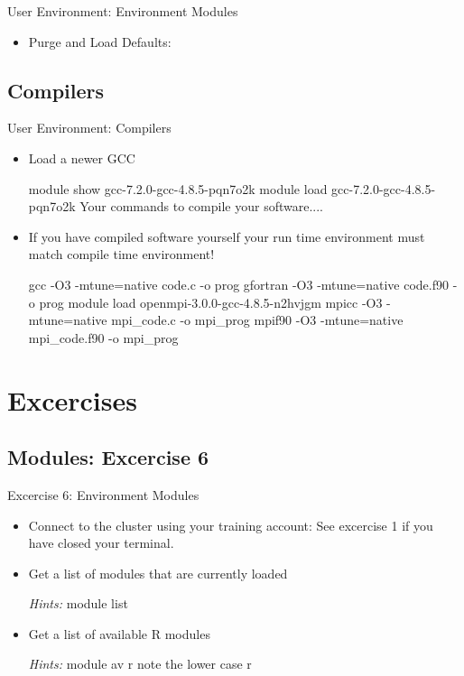 \begin{frame}[fragile]{User Environment: Environment Modules}
\begin{itemize}
\item{Purge and Load Defaults:}
\smallskip
\end{itemize}
\end{frame}

\subsection{Compilers}
\begin{frame}[fragile]{User Environment: Compilers}
  \begin{itemize}
    \item{Load a newer GCC}
\begin{semiverbatim}
\scriptsize
module show gcc-7.2.0-gcc-4.8.5-pqn7o2k
module load gcc-7.2.0-gcc-4.8.5-pqn7o2k
Your commands to compile your software....
\end{semiverbatim}
\medskip
\item{If you have compiled software yourself your run time environment must match compile time environment!}

\begin{semiverbatim}
\scriptsize
gcc -O3 -mtune=native code.c -o prog
gfortran -O3 -mtune=native code.f90 -o prog
\medskip
module load openmpi-3.0.0-gcc-4.8.5-n2hvjgm
mpicc -O3 -mtune=native mpi_code.c -o mpi_prog
mpif90 -O3 -mtune=native mpi_code.f90 -o mpi_prog
\end{semiverbatim}
\pause
\end{itemize}
\end{frame}

\section{Excercises}

\subsection{Modules: Excercise 6}
\begin{frame}[fragile]{Excercise 6: Environment Modules}
\begin{itemize}
\item{Connect to the cluster using your training account: See excercise 1 if you have closed your terminal. }
\item{Get a list of modules that are currently loaded}
\item[\emph{Hints:}]{\alert{module list}}
\item{Get a list of available R modules}
\item[\emph{Hints:}]{\alert{module av r} note the lower case r}
\end{itemize}
\end{frame}

